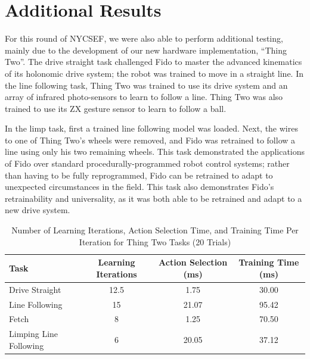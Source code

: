 \documentclass[letterpaper,11pt]{article}
\begin{document}
	\section*{Additional Results}

	For this round of NYCSEF, we were also able to perform additional testing, mainly due to the development of our new hardware implementation, ``Thing Two''.  The drive straight task challenged Fido to master the advanced kinematics of its holonomic drive system; the robot was trained to move in a straight line.  In the line following task, Thing Two was trained to use its drive system and an array of infrared photo-sensors to learn to follow a line.  Thing Two was also trained to use its ZX gesture sensor to learn to follow a ball.   

	In the limp task, first a trained line following model was loaded.  Next, the wires to one of Thing Two's wheels were removed, and Fido was retrained to follow a line using only his two remaining wheels.  This task demonstrated the applications of Fido over standard procedurally-programmed robot control systems; rather than having to be fully reprogrammed, Fido can be retrained to adapt to unexpected circumstances in the field.  This task also demonstrates Fido's retrainability and universality, as it was both able to be retrained and adapt to a new drive system.

	\begin{table}[ht]
		\centering
		\begin{tabular}{@{}lccc@{}}
			\toprule
			Task                   & Learning Iterations & Action Selection (ms) & Training Time (ms) \\ \midrule
			Drive Straight         & 12.5                   & 1.75                    & 30.00                  \\
			Line Following         & 15                  & 21.07                    & 95.42                \\
			Fetch                  & 8                  & 1.25                     & 70.50                 \\
			Limping Line Following & 6                   & 20.05                    & 37.12                 \\ \bottomrule
		\end{tabular}
		\caption{Number of Learning Iterations, Action Selection Time, and Training Time Per Iteration for Thing Two Tasks (20 Trials)}
		\label{tab:data}
	\end{table}
\end{document}

